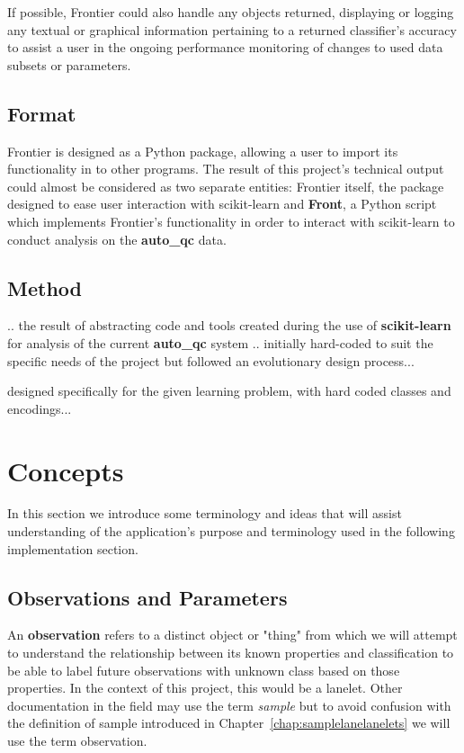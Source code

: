If possible, Frontier could also handle any objects returned, displaying or
logging any textual or graphical information pertaining to a returned
classifier's accuracy to assist a user in the ongoing performance monitoring of
changes to used data subsets or parameters.


\subsection{Format}

Frontier is designed as a Python package, allowing a user to import its
functionality in to other programs. The result of this project's technical
output could almost be considered as two separate entities: Frontier itself, the
package designed to ease user interaction with scikit-learn and \textbf{Front},
a Python script which implements Frontier's functionality in order to interact
with scikit-learn to conduct analysis on the \textbf{auto\_qc} data.


\subsection{Method}

.. the result of abstracting code and tools created during the use of
\textbf{scikit-learn} for analysis of the current \textbf{auto\_qc} system
.. initially hard-coded to suit the specific needs of the project but followed
an evolutionary design process...

designed specifically for the given learning problem, with hard coded
classes and encodings...


\section{Concepts}

In this section we introduce some terminology and ideas that will assist
understanding of the application's purpose and terminology used in the following
implementation section.


\subsection{Observations and Parameters}

An \textbf{observation} refers to a distinct object or "thing" from which we
will attempt to understand the relationship between its known properties and
classification to be able to label future observations with unknown class based
on those properties. In the context of this project, this would be a lanelet.
Other documentation in the field may use the term \textit{sample} but to avoid
confusion with the definition of sample introduced in
Chapter~\ref{chap:samplelanelanelets} we will use the term observation.

